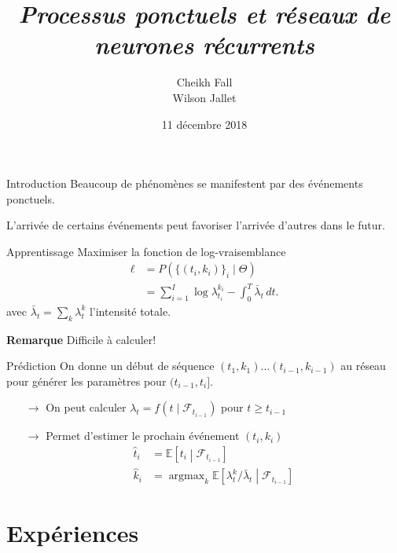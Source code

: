 \documentclass{beamer}
\title{
	\textit{Processus ponctuels et réseaux de neurones récurrents}
}
\author{Cheikh Fall\\Wilson Jallet}
\date{11 décembre 2018}
\newcommand{\EE}{\mathbb{E}}
\DeclareMathOperator*{\argmax}{argmax} %
\begin{document}
\maketitle

\begin{frame}{Introduction}
Beaucoup de phénomènes se manifestent par des événements ponctuels.\pause

L'arrivée de certains événements peut favoriser l'arrivée d'autres dans le futur.
\end{frame}



\begin{frame}{Apprentissage}
Maximiser la fonction de log-vraisemblance
\begin{equation}\label{eq:logLikelihood}
\begin{aligned}
\ell &= P\left( \{(t_i,k_i)\}_i \mid \Theta \right) \\
&= \sum_{i=1}^{I}\log \lambda^{k_i}_{t_i} - \int_0^T \bar{\lambda}_t\,dt.
\end{aligned}
\end{equation}
avec $\bar{\lambda}_t = \sum_k \lambda^k_t$ l'intensité totale.

\textbf{Remarque} Difficile à calculer!
\end{frame}

\begin{frame}{Prédiction}
On donne un début de séquence $(t_1,k_1)\ldots (t_{i-1}, k_{i-1})$ au réseau pour générer les paramètres pour $(t_{i-1}, t_i]$.
\begin{itemize}
	\item[$\rightarrow$] On peut calculer $\lambda_t = f(t\mid\mathcal{F}_{t_{i-1}})$ pour $t\geq t_{i-1}$
	\item[$\rightarrow$] Permet d'estimer le prochain événement $(t_i, k_i)$
	\[
	\begin{aligned}
		\hat{t}_i &= \EE\left[t_i \middle| \mathcal{F}_{t_{i-1}}\right] \\
		\hat{k}_i &= \argmax_{k}\EE\left[\lambda^k_t/\bar{\lambda}_t\middle| \mathcal{F}_{t_{i-1}} \right]
	\end{aligned}
	\]
\end{itemize}
\end{frame}

\section{Expériences}
\end{document}
